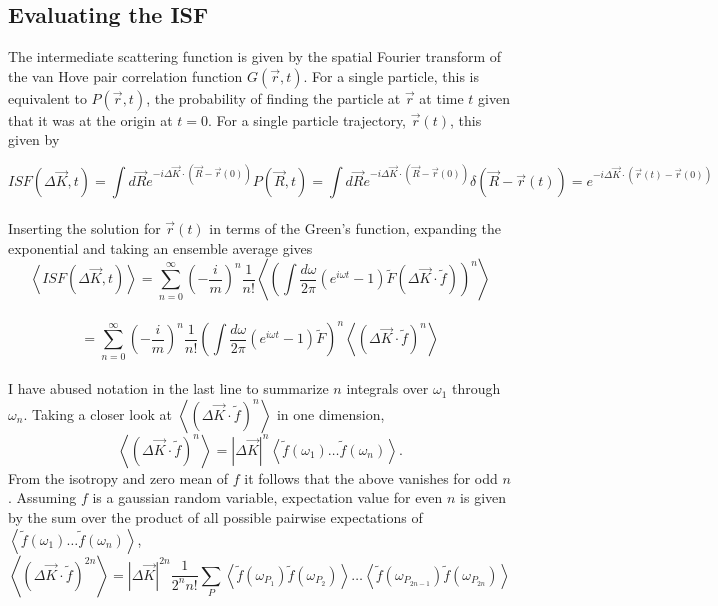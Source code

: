 \documentclass[7pt]{article}
\begin{document}
\subsection*{Evaluating the ISF}

The intermediate scattering function is given by the spatial Fourier transform of the van Hove pair correlation function $G\left(\vec{r},t\right)$. For a single particle, this is equivalent to $P\left(\vec{r}, t\right)$, the probability of finding the particle at $\vec{r}$ at time $t$ given that it was at the origin at $t=0$. For a single particle trajectory, $\vec{r}(t)$, this given by 

$$
ISF(\Delta \vec{K}, t) = \int d\vec{R} e^{-i \Delta \vec{K} \cdot \left(\vec{R} - \vec{r}(0)\right)} P(\vec{R}, t) = \int d\vec{R} e^{-i \Delta \vec{K} \cdot \left(\vec{R} - \vec{r}(0)\right)} \delta(\vec{R} - \vec{r}(t)) = e^{-i \Delta \vec{K} \cdot \left(\vec{r}(t) - \vec{r}(0)\right)}
$$
\\
Inserting the solution for $\vec{r}(t)$ in terms of the Green's function, expanding the exponential and taking an ensemble average gives
$$
\left<ISF(\Delta \vec{K}, t)\right> = \sum_{n=0}^{\infty} \left(- \frac{i}{m}\right)^n \frac{1}{n!} \left< \left( \int \frac{d\omega}{2\pi} \left(e^{i\omega t} - 1\right) \tilde{F} \left(\Delta \vec{K} \cdot \tilde{f}\right)\right)^n\right>
$$
\\
\begin{equation}
= \sum_{n=0}^{\infty} \left(- \frac{i}{m}\right)^n \frac{1}{n!} \left( \int \frac{d\omega}{2\pi} \left(e^{i\omega t} - 1\right) \tilde{F}\right)^n \left< \left(\Delta \vec{K} \cdot \tilde{f}\right)^n\right> \label{eq:isf_1}
\end{equation}
\\
I have abused notation in the last line to summarize $n$ integrals over $\omega_1$ through $\omega_n$. Taking a closer look at $\left< \left(\Delta \vec{K} \cdot \tilde{f}\right)^n\right>$ in one dimension,
$$
\left< \left(\Delta \vec{K} \cdot \tilde{f}\right)^n\right> = \left|\Delta \vec{K}\right|^n \left< \tilde{f}\left(\omega_1\right) \ldots \tilde{f}\left(\omega_n\right)\right>.
$$
From the isotropy and zero mean of $f$ it follows that the above vanishes for odd $n$. Assuming $f$ is a gaussian random variable, expectation value for even $n$ is given by the sum over the product of all possible pairwise expectations of $\left< \tilde{f}\left(\omega_1\right) \ldots \tilde{f}\left(\omega_n\right) \right>$,
$$
\left< \left(\Delta \vec{K} \cdot \tilde{f}\right)^{2n}\right> = \left|\Delta \vec{K}\right|^{2n} \frac{1}{2^nn!} \sum_P \left< \tilde{f}\left(\omega_{P_1}\right) \tilde{f}\left(\omega_{P_2}\right)\right> \ldots \left< \tilde{f}\left(\omega_{P_{2n-1}}\right) \tilde{f}\left(\omega_{P_{2n}}\right)\right>
$$
\end{document}
